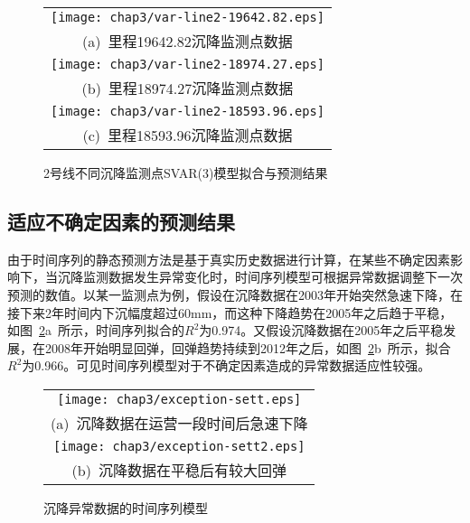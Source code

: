 \begin{figure}[htbp] 
    \centering 
    \begin{tabular}{c} 
        \texttt{[image: chap3/var-line2-19642.82.eps]} \\ 
        (a)~里程19642.82沉降监测点数据 \\
        \texttt{[image: chap3/var-line2-18974.27.eps]} \\ 
        (b)~里程18974.27沉降监测点数据 \\
        \texttt{[image: chap3/var-line2-18593.96.eps]} \\ 
        (c)~里程18593.96沉降监测点数据 \\
    \end{tabular}
    \caption{2号线不同沉降监测点SVAR(3)模型拟合与预测结果} 
    \label{fig:2号线不同沉降监测点SVAR3模型拟合与预测结果} 
\end{figure}

\subsection{适应不确定因素的预测结果}

由于时间序列的静态预测方法是基于真实历史数据进行计算，在某些不确定因素影响下，当沉降监测数据发生异常变化时，时间序列模型可根据异常数据调整下一次预测的数值。以某一监测点为例，假设在沉降数据在2003年开始突然急速下降，在接下来2年时间内下沉幅度超过60mm，而这种下降趋势在2005年之后趋于平稳，如图~\ref{fig:沉降异常数据的时间序列模型}a~所示，时间序列拟合的$R^2$为0.974。又假设沉降数据在2005年之后平稳发展，在2008年开始明显回弹，回弹趋势持续到2012年之后，如图~\ref{fig:沉降异常数据的时间序列模型}b~所示，拟合$R^2$为0.966。可见时间序列模型对于不确定因素造成的异常数据适应性较强。

\begin{figure}[htbp] 
    \centering 
    \begin{tabular}{c} 
        \texttt{[image: chap3/exception-sett.eps]} \\ 
        (a)~沉降数据在运营一段时间后急速下降 \\
        \texttt{[image: chap3/exception-sett2.eps]} \\ 
        (b)~沉降数据在平稳后有较大回弹 \\
    \end{tabular}
    \caption{沉降异常数据的时间序列模型} 
    \label{fig:沉降异常数据的时间序列模型} 
\end{figure}

